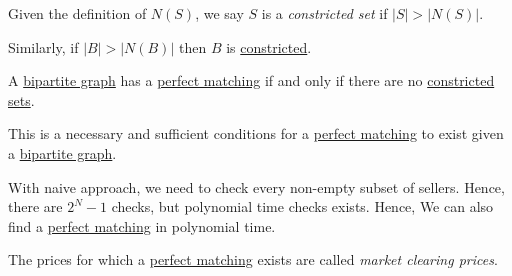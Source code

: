 \begin{definition}\label{def:constricted-set}
	Given the definition of \(N(S)\), we say \(S\) is a \emph{constricted set} if \(\left\vert S \right\vert > \left\vert N(S) \right\vert \).
\end{definition}

\begin{note}
	Similarly, if \(\left\vert B \right\vert > \left\vert N(B) \right\vert \) then \(B\) is \hyperref[def:constricted-set]{constricted}.
\end{note}


\begin{theorem}\label{thm:Konig-Hall-maximize-theorem}
	A \href{https://en.wikipedia.org/wiki/Bipartite_graph}{bipartite graph} has a \hyperref[def:perfect-matching]{perfect matching}
	if and only if there are no \hyperref[def:constricted-set]{constricted sets}.
\end{theorem}
\begin{note}
	This is a necessary and sufficient conditions for a \hyperref[def:perfect-matching]{perfect matching} to exist given a
	\href{https://en.wikipedia.org/wiki/Bipartite_graph}{bipartite graph}.
\end{note}

\begin{remark}
	With naive approach, we need to check every non-empty subset of sellers. Hence, there are \(2^N - 1\) checks, but
	polynomial time checks exists. Hence, We can also find a \hyperref[def:perfect-matching]{perfect matching} in polynomial time.

	\begin{note}\label{note:market-clearing-prices}
		The prices for which a \hyperref[def:perfect-matching]{perfect matching} exists are called \emph{market clearing prices}.
	\end{note}
\end{remark}